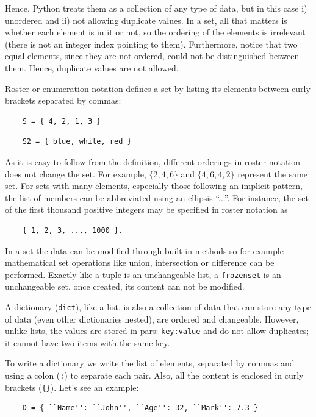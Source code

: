 Hence, Python treats them as a collection of any type of data, but in this case i) unordered and ii) not allowing duplicate values. 
In a set, all that matters is whether each element is in it or not, so the ordering of the elements is irrelevant (there is not an integer index pointing to them).
Furthermore, notice that two equal elements, since they are not ordered, could not be distinguished between them. Hence, duplicate values are not allowed. 

Roster or enumeration notation defines a set by listing its elements between curly brackets separated by commas:
\begin{verbatim}
    S = { 4, 2, 1, 3 }
\end{verbatim}
\begin{verbatim}
    S2 = { blue, white, red }
\end{verbatim}
As it is easy to follow from the definition, different orderings in roster notation does not change the set.
For example, $\{ 2, 4, 6 \}$ and $\{ 4, 6, 4, 2 \}$ represent the same set.
For sets with many elements, especially those following an implicit pattern,
the list of members can be abbreviated using an ellipsis ``...''.
For instance, the set of the first thousand positive integers 
may be specified in roster notation as
\begin{verbatim}
    { 1, 2, 3, ..., 1000 }.
\end{verbatim}
In a set the data can be modified through built-in methods so for example mathematical set operations like union, intersection or difference can be performed.
Exactly like a tuple is an unchangeable list, a \texttt{frozenset} is an unchangeable set, once created, its content can not be modified. 

A dictionary (\texttt{dict}), like a list, is also a collection of data that can store any type of data (even other dictionaries nested), are ordered and changeable.
However, unlike lists, the values are stored in pars: \texttt{key:value} and do not allow duplicates; it cannot have two items with the same key.

To write a dictionary we write the list of elements, separated by commas and using a colon (\texttt{:}) to separate each pair. 
Also, all the content is enclosed in curly brackets (\texttt{\{\}}). 
Let's see an example:
\begin{verbatim}
    D = { ``Name'': ``John'', ``Age'': 32, ``Mark'': 7.3 }
\end{verbatim}

